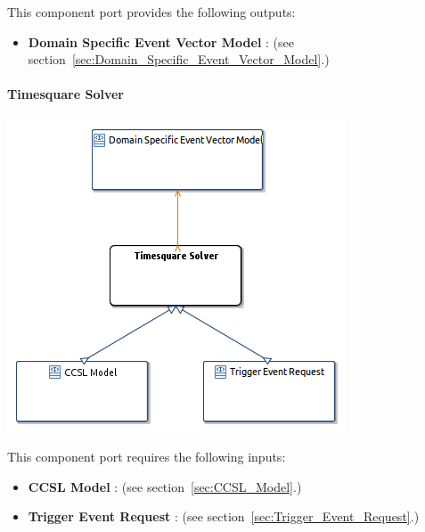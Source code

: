 \documentclass{gemoc} %
\begin{document}
This component port provides the following outputs:
\begin{itemize}
  \item \textbf{Domain Specific Event Vector Model} :
(see section~\ref{sec:Domain_Specific_Event_Vector_Model}.)
\end{itemize}

\paragraph{Timesquare Solver}
\label{sec:Timesquare_Solver}


\begin{center}
\includegraphics*[trim=0.0cm 0.0cm 0cm 0.0cm, clip=true]{../images/generated/Generated_Timesquare_Solver.png}
\end{center}

This component port requires the following inputs:
\begin{itemize}
  \item \textbf{CCSL Model} :
(see section~\ref{sec:CCSL_Model}.)
  \item \textbf{Trigger Event Request} :
(see section~\ref{sec:Trigger_Event_Request}.)
\end{itemize}
\end{document}
